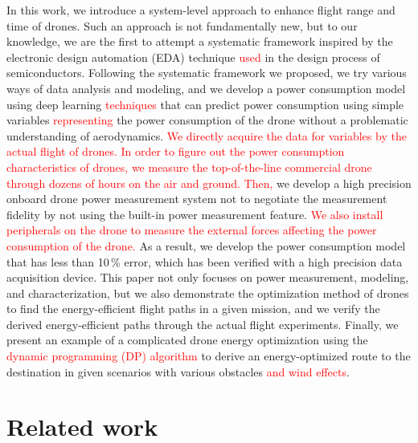 \documentclass[journal]{./template/IEEEtran}
\begin{document}
In this work, we introduce a system-level approach to enhance flight range and time of drones.
Such an approach is not fundamentally new, but to our knowledge, we are the first to attempt a systematic framework inspired by the electronic design automation (EDA) technique \textcolor{red}{used} in the design process of semiconductors.
Following the systematic framework we proposed, we try various ways of data analysis and modeling, and we develop a power consumption model using deep learning \textcolor{red}{techniques} that can predict power consumption using simple variables \textcolor{red}{representing} the power consumption of the drone without a problematic understanding of aerodynamics.
\textcolor{red}{We directly acquire the data for variables by the actual flight of drones.
In order to figure out the power consumption characteristics of drones, we measure the top-of-the-line commercial drone through dozens of hours on the air and ground.}
\textcolor{red}{Then,} we develop a high precision onboard drone power measurement system not to negotiate the measurement fidelity by not using the built-in power measurement feature. \textcolor{red}{We also install peripherals on the drone to measure the external forces affecting the power consumption of the drone.}
As a result, we develop the power consumption model that has less than 10\,\% error, which has been verified with a high precision data acquisition device.
This paper not only focuses on power measurement, modeling, and characterization, but we also demonstrate the optimization method of drones to find the energy-efficient flight paths in a given mission, and we verify the derived energy-efficient paths through the actual flight experiments.
Finally, we present an example of a complicated drone energy optimization using the \textcolor{red}{dynamic programming (DP) algorithm} to derive an energy-optimized route to the destination in given scenarios with various obstacles \textcolor{red}{and wind effects}.









\section{Related work}
\end{document}
